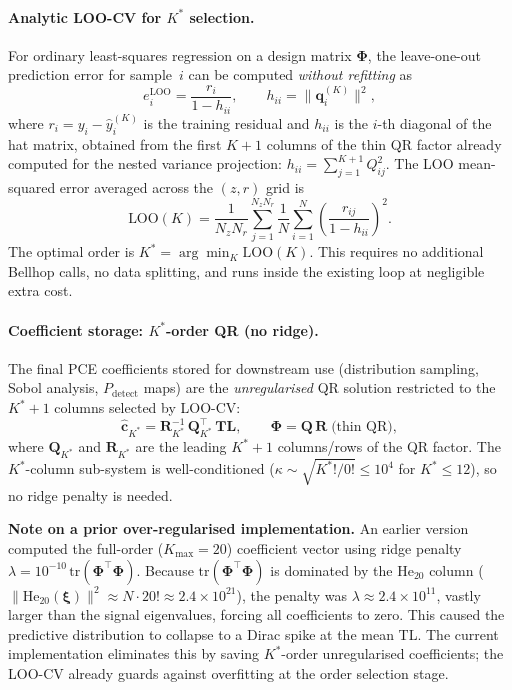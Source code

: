 \documentclass[11pt,a4paper]{article}
\begin{document}
\paragraph{Analytic LOO-CV for $K^*$ selection.}
For ordinary least-squares regression on a design matrix $\boldsymbol\Phi$,
the leave-one-out prediction error for sample~$i$ can be computed \emph{without
refitting} as
\begin{equation}
  e_i^{\text{LOO}} = \frac{r_i}{1 - h_{ii}},
  \qquad h_{ii} = \lVert \mathbf{q}_i^{(K)}\rVert^2,
  \label{eq:loo}
\end{equation}
where $r_i = y_i - \hat{y}_i^{(K)}$ is the training residual and
$h_{ii}$ is the $i$-th diagonal of the hat matrix, obtained from the first
$K+1$ columns of the thin QR factor already computed for the nested variance
projection: $h_{ii} = \sum_{j=1}^{K+1} Q_{ij}^2$.
The LOO mean-squared error averaged across the $(z,r)$ grid is
\begin{equation}
  \text{LOO}(K) = \frac{1}{N_z N_r}\sum_{j=1}^{N_z N_r}
                  \frac{1}{N}\sum_{i=1}^{N}
                  \left(\frac{r_{ij}}{1-h_{ii}}\right)^2.
  \label{eq:loo_mean}
\end{equation}
The optimal order is $K^* = \arg\min_K \text{LOO}(K)$.
This requires no additional Bellhop calls, no data splitting, and runs inside the
existing loop at negligible extra cost.

\paragraph{Coefficient storage: $K^*$-order QR (no ridge).}
The final PCE coefficients stored for downstream use (distribution sampling,
Sobol analysis, $P_\text{detect}$ maps) are the \emph{unregularised} QR
solution restricted to the $K^*+1$ columns selected by LOO-CV:
\begin{equation}
  \hat{\mathbf{c}}_{K^*} = \mathbf{R}_{K^*}^{-1}\,\mathbf{Q}_{K^*}^\top\,\mathbf{TL},
  \qquad
  \boldsymbol\Phi = \mathbf{Q}\,\mathbf{R}\;\text{(thin QR)},
  \label{eq:coef_kstar}
\end{equation}
where $\mathbf{Q}_{K^*}$ and $\mathbf{R}_{K^*}$ are the leading $K^*+1$ columns/rows of
the QR factor.
The $K^*$-column sub-system is well-conditioned
($\kappa \sim \sqrt{K^*!/0!} \leq 10^4$ for $K^* \leq 12$),
so no ridge penalty is needed.

\textbf{Note on a prior over-regularised implementation.}
An earlier version computed the full-order ($K_{\max}=20$) coefficient vector using
ridge penalty $\lambda = 10^{-10}\,\mathrm{tr}(\boldsymbol\Phi^\top\boldsymbol\Phi)$.
Because $\mathrm{tr}(\boldsymbol\Phi^\top\boldsymbol\Phi)$ is dominated by the
$\mathrm{He}_{20}$ column
($\|\mathrm{He}_{20}(\boldsymbol\xi)\|^2 \approx N\cdot 20! \approx 2.4\times10^{21}$),
the penalty was $\lambda \approx 2.4\times10^{11}$, vastly larger than the signal
eigenvalues, forcing all coefficients to zero.
This caused the predictive distribution to collapse to a Dirac spike at the mean TL.
The current implementation eliminates this by saving $K^*$-order unregularised
coefficients; the LOO-CV already guards against overfitting at the order selection stage.
\end{document}
